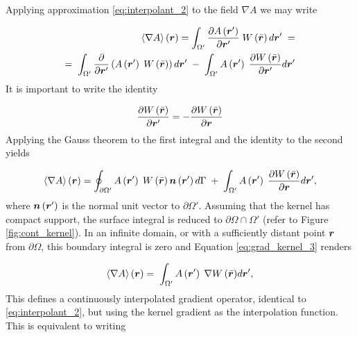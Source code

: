 Applying approximation \eqref{eq:interpolant_2} to the field $\nabla A$ we may write

% 
\begin{equation} \label{eq:grad_kernel_1}
\begin{split}
\left\langle {\nabla A} \right\rangle \left( {\boldsymbol{r}} \right) = \int_{\Omega '} \frac{\partial A \left( {\boldsymbol{r}'} \right)}{\partial {\boldsymbol{r}}'} \; W \left( \bar{\boldsymbol{r}} \right)d{\boldsymbol{r}}'\;= \\
=\; \int_{\Omega '} \frac{\partial}{\partial {\boldsymbol{r}}'} \left( A \left( {\boldsymbol{r}'} \right)\; W \left( \bar{\boldsymbol{r}} \right)\right)d{\boldsymbol{r}}'\; -\; \int_{\Omega '} A \left( {\boldsymbol{r}'} \right) \; \frac{\partial W \left( \bar{\boldsymbol{r}} \right)}{\partial {\boldsymbol{r}}'}d{\boldsymbol{r}}'
\end{split}
\end{equation}
%
It is important to write the identity 

% 
\begin{equation} \label{eq:grad_kernel_2}
\frac{\partial W \left( \bar{\boldsymbol{r}} \right)}{\partial {\boldsymbol{r}}'}= - \frac{\partial W \left( \bar{\boldsymbol{r}} \right)}{\partial {\boldsymbol{r}}}
\end{equation}
%
Applying the Gauss theorem to the first integral and the identity to the second yields

% 
\begin{equation} \label{eq:grad_kernel_3}
\left\langle {\nabla A} \right\rangle \left( {\boldsymbol{r}} \right) = \oint_{\partial\Omega '} A \left( {\boldsymbol{r}'} \right) \; W \left( \bar{\boldsymbol{r}} \right) \boldsymbol{n}\left( {\boldsymbol{r}'} \right) d\Gamma\;+ \; \int_{\Omega '} A \left( {\boldsymbol{r}'} \right) \; \frac{\partial W \left( \bar{\boldsymbol{r}} \right)}{\partial {\boldsymbol{r}}}d{\boldsymbol{r}}',
\end{equation}
%
where $\boldsymbol{n}\left( {\boldsymbol{r}'} \right)$ is the normal unit vector to $\partial\Omega'$. Assuming that the kernel has compact support, the surface integral is reduced to $\partial \Omega \cap \Omega'$ (refer to Figure \ref{fig:cont_kernel}). In an infinite domain, or with a sufficiently distant point $\boldsymbol{r}$ from $\partial \Omega$, this boundary integral is zero and Equation \eqref{eq:grad_kernel_3} renders

% 
\begin{equation} \label{eq:grad_kernel_4}
\left\langle {\nabla A} \right\rangle \left( {\boldsymbol{r}} \right) = \; \int_{\Omega '} A \left( {\boldsymbol{r}'} \right) \; \nabla { W \left( \bar{\boldsymbol{r}} \right)}d{\boldsymbol{r}}',
\end{equation}
%
This defines a continuously interpolated gradient operator, identical to \eqref{eq:interpolant_2}, but using the kernel gradient as the interpolation function. This is equivalent to writing

